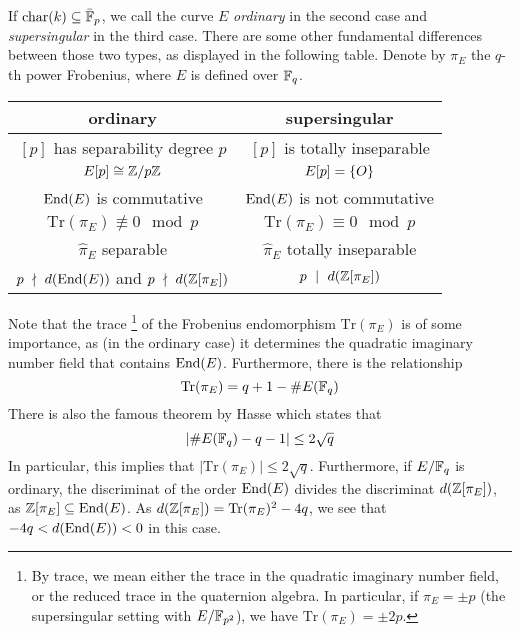 If $\mathrm{char}(k) \subseteq \bar{\mathbb{F}}_p$, we call the curve $E$ \emph{ordinary} in the second case and \emph{supersingular} in the third case.
There are some other fundamental differences between those two types, as displayed in the following table.
Denote by $\pi_E$ the $q$-th power Frobenius, where $E$ is defined over $\mathbb{F}_q$.
\begin{center}
    \begin{tabular}{c | c}
        ordinary & supersingular \\
        \hline
        $[p]$ has separability degree $p$ & $[p]$ is totally inseparable \\
        $E[p] \cong \mathbb{Z}/p\mathbb{Z}$ & $E[p] = \{ O \}$ \\
        $\mathrm{End}(E)$ is commutative & $\mathrm{End}(E)$ is not commutative \\
        $\mathrm{Tr}(\pi_E) \not\equiv 0 \mod p$ & $\mathrm{Tr}(\pi_E) \equiv 0 \mod p$ \\
        $\hat{\pi}_E$ separable & $\hat{\pi}_E$ totally inseparable \\
        $p \ \nmid \  d(\mathrm{End}(E))$ and $p \ \nmid \  d(\mathbb{Z}[\pi_E])$ & $p \ \mid \  d(\mathbb{Z}[\pi_E])$
    \end{tabular}
\end{center}
Note that the trace
\footnote{By trace, we mean either the trace in the quadratic imaginary number field, or the reduced trace in the quaternion algebra. In particular, if $\pi_E = \pm p$ (the supersingular setting with $E/\mathbb{F}_{p^2}$), we have $\mathrm{Tr}(\pi_E) = \pm 2p$.}
of the Frobenius endomorphism $\mathrm{Tr}(\pi_E)$ is of some importance, as (in the ordinary case) it determines the quadratic imaginary number field that contains $\mathrm{End}(E)$.
Furthermore, there is the relationship
\begin{equation*}
    \mathrm{Tr}(\pi_E) = q + 1 - \#E(\mathbb{F}_q)
\end{equation*}
There is also the famous theorem by Hasse \cite[Thm V.1.1]{arithmetic_elliptic_curves} which states that
\begin{equation*}
    |\#E(\mathbb{F}_q) - q - 1| \leq 2\sqrt{q}
\end{equation*}
In particular, this implies that $|\mathrm{Tr}(\pi_E)| \leq 2\sqrt{q}$.
Furthermore, if $E/\mathbb{F}_q$ is ordinary, the discriminat of the order $\mathrm{End}(E)$ divides the discriminat $d(\mathbb{Z}[\pi_E])$, as $\mathbb{Z}[\pi_E] \subseteq \mathrm{End}(E)$.
As $d(\mathbb{Z}[\pi_E]) = \mathrm{Tr}(\pi_E)^2 - 4q$, we see that $-4q < d(\mathrm{End}(E)) < 0$ in this case.

